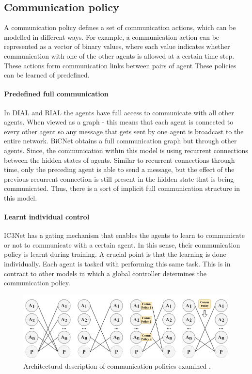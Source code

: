 \documentclass{article}
\begin{document}
\subsection{Communication policy}


A communication policy defines a set of communication actions, which can be modelled in different ways. For example, a communication action can be represented as a vector of binary values, where each value indicates whether communication with one of the other agents is allowed at a certain time step. These actions form communication links between pairs of agent These policies can be learned of predefined. 

\paragraph{Predefined full communication} In DIAL and RIAL \citet{foerster2016learning} the agents have full access to communicate with all other agents. When viewed as a graph - this means that each agent is connected to every other agent so any message that gets sent by one agent is broadcast to the entire network. BiCNet \citep{peng2017bicnet} obtains a full communication graph but through other agents. Since, the communication within this model is using recurrent connections between the hidden states of agents. Similar to recurrent connections through time, only the preceding agent is able to send a message, but the effect of the previous recurrent connection is still present in the hidden state that is being communicated. Thus, there is a sort of implicit full communication structure in this model. 

\paragraph{Learnt individual control} IC3Net \citep{singh2018ic3net} has a gating mechanism that enables the agents to learn to communicate or not to communicate with a certain agent. In this sense, their communication policy is learnt during training. A crucial point is that the learning is done individually. Each agent is tasked with performing this same task. This is in contract to other models in which a global controller determines the communication policy. 

\begin{figure}
	\centering
	\includegraphics[scale=0.5]{images/communication_policies.png}
	\caption{Architectural description of communication policies examined \citet{zhu2024survey}. }
	\label{fig:communication_policies}
\end{figure}
\end{document}
